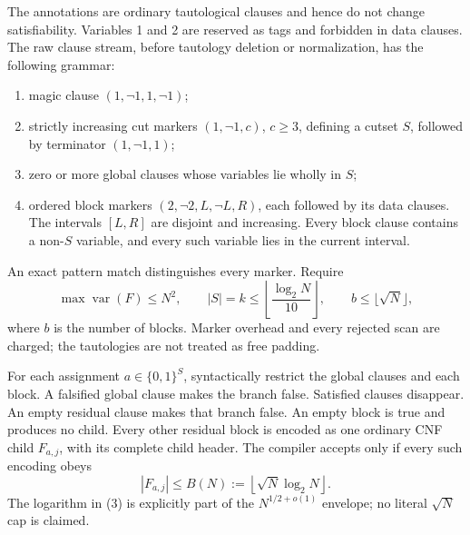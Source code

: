 \documentclass[11pt]{article}
\begin{document}
The annotations are ordinary tautological clauses and hence do not change
satisfiability.  Variables 1 and 2 are reserved as tags and forbidden in data
clauses.  The raw clause stream, before tautology deletion or normalization,
has the following grammar:
\begin{enumerate}
\item magic clause $(1,\neg1,1,\neg1)$;
\item strictly increasing cut markers $(1,\neg1,c)$, $c\ge3$, defining a
      cutset $S$, followed by terminator $(1,\neg1,1)$;
\item zero or more global clauses whose variables lie wholly in $S$;
\item ordered block markers $(2,\neg2,L,\neg L,R)$, each followed by its
      data clauses.  The intervals $[L,R]$ are disjoint and increasing.
      Every block clause contains a non-$S$ variable, and every such variable
      lies in the current interval.
\end{enumerate}
An exact pattern match distinguishes every marker.  Require
\[
 \max\operatorname{var}(F)\le N^2,\qquad
 |S|=k\le \left\lfloor \frac{\log_2 N}{10}\right\rfloor,
 \qquad b\le\lfloor\sqrt N\rfloor,                         \tag{2}
\]
where $b$ is the number of blocks.  Marker overhead and every rejected scan
are charged; the tautologies are not treated as free padding.

For each assignment $a\in\{0,1\}^S$, syntactically restrict the global
clauses and each block.  A falsified global clause makes the branch false.
Satisfied clauses disappear.  An empty residual clause makes that branch
false.  An empty block is true and produces no child.  Every other residual
block is encoded as one ordinary CNF child $F_{a,j}$, with its complete child
header.  The compiler accepts only if every such encoding obeys
\[
 |F_{a,j}|\le B(N):=\left\lfloor\sqrt N\log_2 N\right\rfloor. \tag{3}
\]
The logarithm in (3) is explicitly part of the $N^{1/2+o(1)}$ envelope; no
literal $\sqrt N$ cap is claimed.
\end{document}
